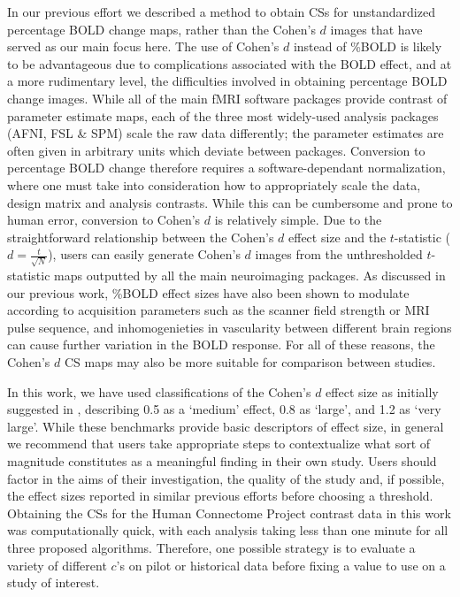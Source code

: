 In our previous effort we described a method to obtain CSs for unstandardized percentage BOLD change maps, rather than the Cohen's $d$ images that have served as our main focus here. The use of Cohen's $d$ instead of \%BOLD is likely to be advantageous due to complications associated with the BOLD effect, and at a more rudimentary level, the difficulties involved in obtaining percentage BOLD change images. While all of the main fMRI software packages provide contrast of parameter estimate maps, each of the three most widely-used analysis packages (AFNI, FSL \& SPM) scale the raw data differently; the parameter estimates are often given in arbitrary units which deviate between packages. Conversion to percentage BOLD change therefore requires a software-dependant normalization, where one must take into consideration how to appropriately scale the data, design matrix and analysis contrasts. While this can be cumbersome and prone to human error, conversion to Cohen's $d$ is relatively simple. Due to the straightforward relationship between the Cohen's $d$ effect size and the $t$-statistic \Big($d = \frac{t}{\sqrt{N}}$\Big), users can easily generate Cohen's $d$ images from the unthresholded $t$-statistic maps outputted by all the main neuroimaging packages. As discussed in our previous work, \%BOLD effect sizes have also been shown to modulate according to acquisition parameters such as the scanner field strength or MRI pulse sequence, and inhomogenieties in vascularity between different brain regions can cause further variation in the BOLD response. For all of these reasons, the Cohen's $d$ CS maps may also be more suitable for comparison between studies. 

In this work, we have used classifications of the Cohen's $d$ effect size as initially suggested in \textit{\citet*{Cohen2013-it}}, describing 0.5 as a `medium' effect, 0.8 as `large', and 1.2 as `very large'. While these benchmarks provide basic descriptors of effect size, in general we recommend that users take appropriate steps to contextualize what sort of magnitude constitutes as a meaningful finding in their own study. Users should factor in the aims of their investigation, the quality of the study and, if possible, the effect sizes reported in similar previous efforts before choosing a threshold. Obtaining the CSs for the Human Connectome Project contrast data in this work was computationally quick, with each analysis taking less than one minute for all three proposed algorithms. Therefore, one possible strategy is to evaluate a variety of different $c$'s on pilot or historical data before fixing a value to use on a study of interest.

